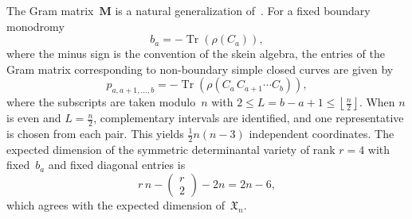 \documentclass[12pt,reqno]{amsart}
\DeclareMathOperator{\Tr}{Tr}
\begin{document}
The Gram  matrix~$\mathbf{M}$
is a natural generalization of~\cite{KHikami26a}.
For a fixed boundary monodromy
\begin{equation}
  b_a=-\Tr\left(\rho(C_a)\right) ,
\end{equation}
where the minus sign is the convention of  the   skein algebra,
the entries of the  Gram matrix  corresponding to non-boundary simple
closed curves are given  by
\begin{equation}
  p_{a,a+1,\dots, b}
  =-\Tr\left(\rho(C_a \, C_{a+1}\cdots C_b)\right) ,
\end{equation}
where the subscripts
are taken modulo~$n$  with
$2 \leq L=b-a+1\leq
\left\lfloor \frac{n}{2} \right\rfloor  $.
When $n$ is even and $L=\frac{n}{2}$, complementary intervals are
identified, and one representative is chosen from each pair.
This yields
$\frac{1}{2}n(n-3)$ independent coordinates.
The expected  dimension of the symmetric determinantal variety of rank $r=4$
with
fixed~$b_a$ and  fixed diagonal entries is
\begin{equation*}
r \,n-
\begin{pmatrix}
  r \\
  2
\end{pmatrix}
-2n=2n-6,
\end{equation*}
which
agrees with
the expected dimension of~$\mathfrak{X}_n$.
\end{document}
